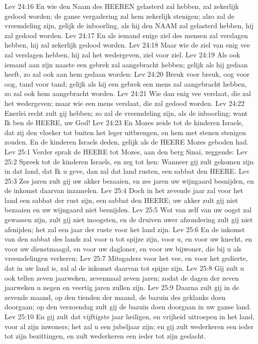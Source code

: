 Lev 24:16  En wie den Naam des HEEREN gelasterd zal hebben, zal zekerlijk gedood worden; de ganse vergadering zal hem zekerlijk stenigen; alzo zal de vreemdeling zijn, gelijk de inboorling, als hij den NAAM zal gelasterd hebben, hij zal gedood worden.
Lev 24:17  En als iemand enige ziel des mensen zal verslagen hebben, hij zal zekerlijk gedood worden.
Lev 24:18  Maar wie de ziel van enig vee zal verslagen hebben, hij zal het wedergeven, ziel voor ziel.
Lev 24:19  Als ook iemand aan zijn naaste een gebrek zal aangebracht hebben; gelijk als hij gedaan heeft, zo zal ook aan hem gedaan worden:
Lev 24:20  Breuk voor breuk, oog voor oog, tand voor tand; gelijk als hij een gebrek een mens zal aangebracht hebben, zo zal ook hem aangebracht worden.
Lev 24:21  Wie dan enig vee verslaat, die zal het wedergeven; maar wie een mens verslaat, die zal gedood worden.
Lev 24:22  Enerlei recht zult gij hebben; zo zal de vreemdeling zijn, als de inboorling; want Ik ben de HEERE, uw God!
Lev 24:23  En Mozes zeide tot de kinderen Israels, dat zij den vloeker tot buiten het leger uitbrengen, en hem met stenen stenigen zouden. En de kinderen Israels deden, gelijk als de HEERE Mozes geboden had.
Lev 25:1  Verder sprak de HEERE tot Mozes, aan den berg Sinai, zeggende:
Lev 25:2  Spreek tot de kinderen Israels, en zeg tot hen: Wanneer gij zult gekomen zijn in dat land, dat Ik u geve, dan zal dat land rusten, een sabbat den HEERE.
Lev 25:3  Zes jaren zult gij uw akker bezaaien, en zes jaren uw wijngaard besnijden, en de inkomst daarvan inzamelen.
Lev 25:4  Doch in het zevende jaar zal voor het land een sabbat der rust zijn, een sabbat den HEERE; uw akker zult gij niet bezaaien en uw wijngaard niet besnijden.
Lev 25:5  Wat van zelf van uw oogst zal gewassen zijn, zult gij niet inoogsten, en de druiven uwer afzondering zult gij niet afsnijden; het zal een jaar der ruste voor het land zijn.
Lev 25:6  En de inkomst van den sabbat des lands zal voor u tot spijze zijn, voor u, en voor uw knecht, en voor uw dienstmaagd, en voor uw dagloner, en voor uw bijwoner, die bij u als vreemdelingen verkeren;
Lev 25:7  Mitsgaders voor het vee, en voor het gedierte, dat in uw land is, zal al de inkomst daarvan tot spijze zijn.
Lev 25:8  Gij zult u ook tellen zeven jaarweken, zevenmaal zeven jaren; zodat de dagen der zeven jaarweken u negen en veertig jaren zullen zijn.
Lev 25:9  Daarna zult gij in de zevende maand, op den tienden der maand, de bazuin des geklanks doen doorgaan; op den verzoendag zult gij de bazuin doen doorgaan in uw ganse land.
Lev 25:10  En gij zult dat vijftigste jaar heiligen, en vrijheid uitroepen in het land, voor al zijn inwoners; het zal u een jubeljaar zijn; en gij zult wederkeren een ieder tot zijn bezittingen, en zult wederkeren een ieder tot zijn geslacht.
